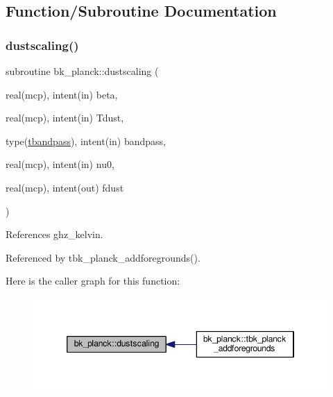 \subsection{Function/\+Subroutine Documentation}
\mbox{\label{namespacebk__planck_a532e314297951fce385bff0bc57f81c3}} 
\subsubsection{\texorpdfstring{dustscaling()}{dustscaling()}}
{\footnotesize\ttfamily subroutine bk\+\_\+planck\+::dustscaling (\begin{DoxyParamCaption}\item[{real(mcp), intent(in)}]{beta,  }\item[{real(mcp), intent(in)}]{Tdust,  }\item[{type(\mbox{\hyperlink{structbk__planck_1_1tbandpass}{tbandpass}}), intent(in)}]{bandpass,  }\item[{real(mcp), intent(in)}]{nu0,  }\item[{real(mcp), intent(out)}]{fdust }\end{DoxyParamCaption})\hspace{0.3cm}{\ttfamily [private]}}



References ghz\+\_\+kelvin.



Referenced by tbk\+\_\+planck\+\_\+addforegrounds().

Here is the caller graph for this function\+:
\nopagebreak
\begin{figure}[H]
\begin{center}
\leavevmode
\includegraphics[width=346pt]{namespacebk__planck_a532e314297951fce385bff0bc57f81c3_icgraph}
\end{center}
\end{figure}
\mbox{\label{namespacebk__planck_ae4ec8dfb07864a47b4f431f0be309608}} 
